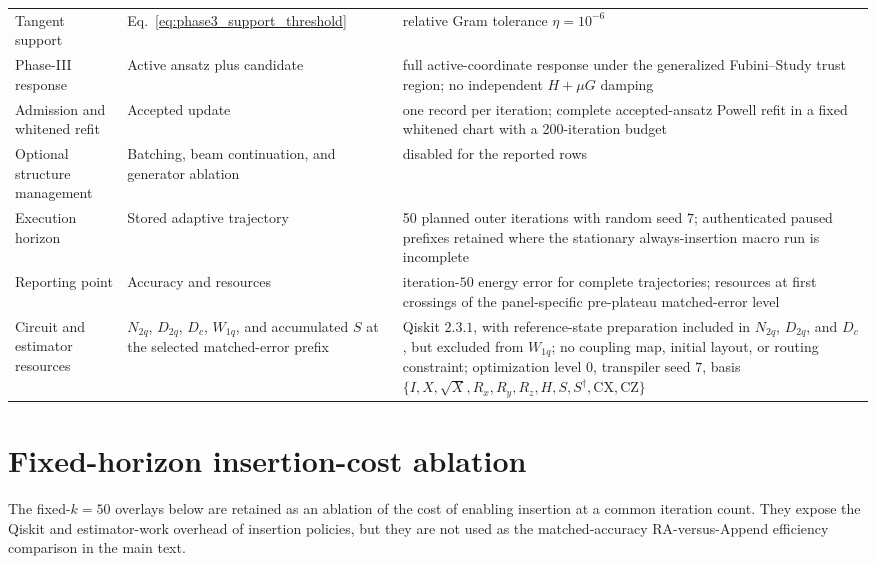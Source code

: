 \documentclass[
  reprint,
  amsmath,
  amssymb,
  aps,
  pra,
  nofootinbib,
  superscriptaddress,
  floatfix
]{revtex4-2}
\begin{document}
\begin{table}[t]
{\begin{tabular}{@{}p{}p{}p{}@{}}
Tangent support & Eq.~\eqref{eq:phase3_support_threshold} & relative Gram tolerance \(\eta=10^{-6}\) \\
Phase-III response & Active ansatz plus candidate & full active-coordinate response under the generalized Fubini--Study trust region; no independent \(H+\mu G\) damping \\
Admission and whitened refit & Accepted update & one record per iteration; complete accepted-ansatz Powell refit in a fixed whitened chart with a 200-iteration budget \\
Optional structure management & Batching, beam continuation, and generator ablation & disabled for the reported rows \\
Execution horizon & Stored adaptive trajectory & 50 planned outer iterations with random seed \(7\); authenticated paused prefixes retained where the stationary always-insertion macro run is incomplete \\
Reporting point & Accuracy and resources & iteration-\(50\) energy error for complete trajectories; resources at first crossings of the panel-specific pre-plateau matched-error level \\
Circuit and estimator resources & \(N_{2q}\), \(D_{2q}\), \(D_c\), \(W_{1q}\), and accumulated \(S\) at the selected matched-error prefix & Qiskit \(2.3.1\), with reference-state preparation included in \(N_{2q}\), \(D_{2q}\), and \(D_c\), but excluded from \(W_{1q}\); no coupling map, initial layout, or routing constraint; optimization level \(0\), transpiler seed \(7\), basis \(\{I,X,\sqrt{X},R_x,R_y,R_z,H,S,S^\dagger,\mathrm{CX},\mathrm{CZ}\}\) \\
\bottomrule
\end{tabular}%
}
\end{table}

\clearpage
\onecolumngrid
\section{Fixed-horizon insertion-cost ablation}
\label{app:fixed_horizon_insertion_costs}

The fixed-\(k=50\) overlays below are retained as an ablation of the cost of
enabling insertion at a common iteration count. They expose the Qiskit and
estimator-work overhead of insertion policies, but they are not used as the
matched-accuracy RA-versus-Append efficiency comparison in the main text.
\end{document}
